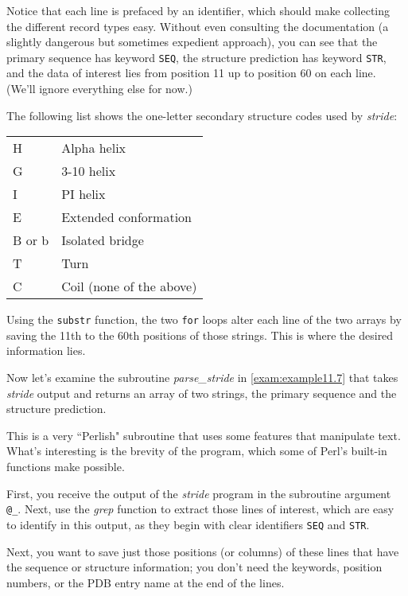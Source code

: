 Notice that each line is prefaced by an identifier, which should make collecting the different record types easy. Without even consulting the documentation (a slightly dangerous but sometimes expedient approach), you can see that the primary sequence has keyword \verb|SEQ|, the structure prediction has keyword \verb|STR|, and the data of interest lies from position 11 up to position 60 on each line. (We'll ignore everything else for now.)

The following list shows the one-letter secondary structure codes used by \textit{stride}: 

\begin{table}[!htbp]
  \begin{center}
  \begin{tabu} to 0.5\linewidth {X[1,l,m]X[2,l,m]}
  \toprule
  H & Alpha helix\\
  G & 3-10 helix\\
  I & PI helix\\
  E & Extended conformation\\
  B or b& Isolated bridge\\
  T & Turn\\
  C & Coil (none of the above)\\
  \bottomrule
  \end{tabu}
  \end{center}
\end{table}

Using the \verb|substr| function, the two \verb|for| loops alter each line of the two arrays by saving the 11th to the 60th positions of those strings. This is where the desired information lies.

Now let's examine the subroutine \textit{parse\_stride} in \autoref{exam:example11.7} that takes \textit{stride} output and returns an array of two strings, the primary sequence and the structure prediction.

This is a very ``Perlish" subroutine that uses some features that manipulate text. What's interesting is the brevity of the program, which some of Perl's built-in functions make possible.

First, you receive the output of the \textit{stride} program in the subroutine argument \verb|@_|. Next, use the \textit{grep} function to extract those lines of interest, which are easy to identify in this output, as they begin with clear identifiers \verb|SEQ| and \verb|STR|.  

Next, you want to save just those positions (or columns) of these lines that have the sequence or structure information; you don't need the keywords, position numbers, or the PDB entry name at the end of the lines.

